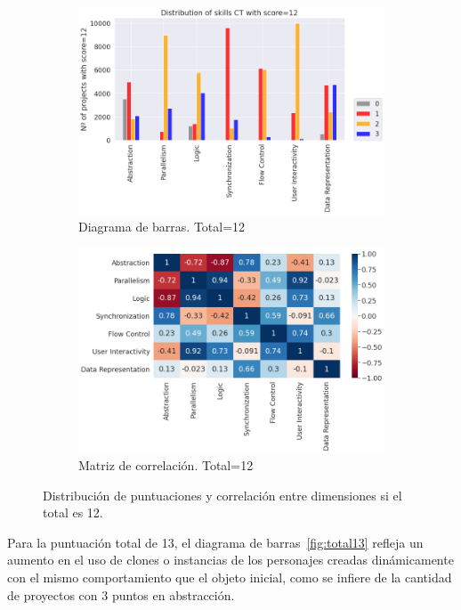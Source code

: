 \documentclass[a4paper, 12pt]{book}
\begin{document}
\begin{figure}[H]
    \centering
    \begin{subfigure}[h]{.49\textwidth} 
        \includegraphics[width=\textwidth]{img/distribucion_12_Scratch}
        \caption{Diagrama de barras. Total=12}
        \label{fig:total12}
    \end{subfigure}       
    \begin{subfigure}[h]{.49\textwidth} 
        \includegraphics[width=\textwidth]{img/corr_12_Scratch}
        \caption{Matriz de correlación. Total=12}
        \label{fig:corr12}
    \end{subfigure}
     \caption{Distribución de puntuaciones y correlación entre dimensiones si el total es 12.}
\end{figure}

Para la puntuación total de 13, el diagrama de barras~\ref{fig:total13} refleja un aumento en el uso de clones o instancias de los personajes creadas dinámicamente con el mismo comportamiento que el objeto inicial, como se infiere de la cantidad de proyectos con 3 puntos en abstracción.
\end{document}
